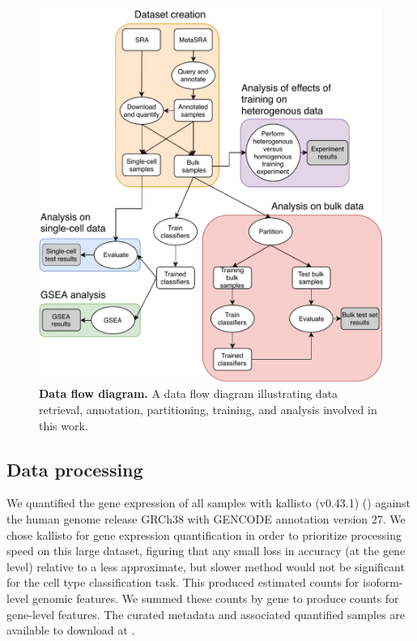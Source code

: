 \begin{figure}[htbp]
    \centerline{\includegraphics[width=13cm]{figures/cell_type_prediction_setup.pdf}}
    \caption{\textbf{Data flow diagram.} A data flow diagram illustrating data retrieval, annotation, partitioning, training, and analysis involved in this work.}
    \label{fig:cell_type_setup}
      \end{figure}

\subsection*{Data processing}

We quantified the gene expression of all samples with kallisto (v0.43.1) (\citealp{Bray2016}) against the human genome release GRCh38 with GENCODE annotation version 27. We chose kallisto for gene expression quantification in order to prioritize processing speed on this large dataset, figuring that any small loss in accuracy (at the gene level) relative to a less approximate, but slower method would not be significant for the cell type classification task. This produced estimated counts for \RawGenomicFeatures{} isoform-level genomic features. We summed these counts by gene to produce counts for \GeneLevelFeatures{} gene-level features. The curated metadata and associated quantified samples are available to download at \DataDownloadURL{}.


